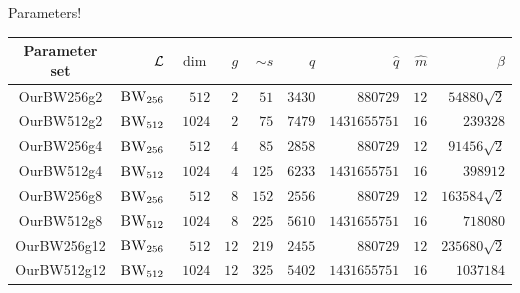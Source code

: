 \documentclass[10pt]{beamer}
\begin{document}
\begin{frame}{Parameters!}

				\begin{table}[htbp]
								\centering
								\setlength{\tabcolsep}{3pt}
								\begin{tabular}{crrrrrrrr}
												\toprule
												Parameter set & $\mathcal{L}$ & $\dim$ & $g$ & $\sim s$ & $q$ & $\hat{q}$ & $\hat{m}$ & $\beta$ \\
												\midrule
												OurBW256g2 & $\textsc{BW}_{256}$ & $512$ & $2$ & $51$ & $3430$ & $880729$ & $12$ & $54880 \sqrt{2}$ \\
												OurBW512g2 & $\textsc{BW}_{512}$ & $1024$ & $2$ & $75$ & $7479$ & $1431655751$ & $16$ & $239328$ \\
												OurBW256g4 & $\textsc{BW}_{256}$ & $512$ & $4$ & $85$ & $2858$ & $880729$ & $12$ & $91456 \sqrt{2}$ \\
												OurBW512g4 & $\textsc{BW}_{512}$ & $1024$ & $4$ & $125$ & $6233$ & $1431655751$ & $16$ & $398912$ \\
												OurBW256g8 & $\textsc{BW}_{256}$ & $512$ & $8$ & $152$ & $2556$ & $880729$ & $12$ & $163584 \sqrt{2}$ \\
												OurBW512g8 & $\textsc{BW}_{512}$ & $1024$ & $8$ & $225$ & $5610$ & $1431655751$ & $16$ & $718080$ \\
												OurBW256g12 & $\textsc{BW}_{256}$ & $512$ & $12$ & $219$ & $2455$ & $880729$ & $12$ & $235680 \sqrt{2}$ \\
												OurBW512g12 & $\textsc{BW}_{512}$ & $1024$ & $12$ & $325$ & $5402$ & $1431655751$ & $16$ & $1037184$ \\
												\bottomrule
								\end{tabular}
				\end{table}

\end{frame}
\end{document}
